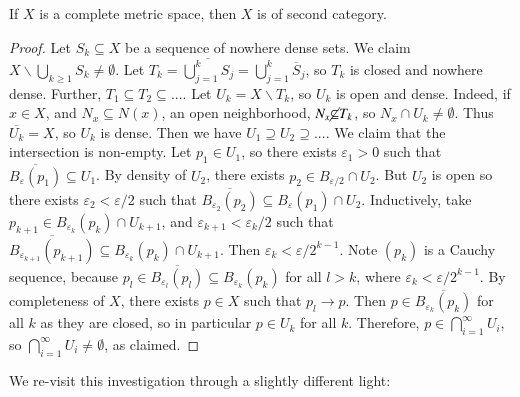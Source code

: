 \begin{theorem}
    If $X$ is a complete metric space, then $X$ is of second category.
\end{theorem}
\begin{proof}
    Let $S_k \subseteq X$ be a sequence of nowhere dense sets. We claim $X \backslash \bigcup_{k\geq 1}S_k \neq \emptyset$. Let $T_k = \overline{\bigcup_{j=1}^kS_j} = \bigcup_{j=1}^k\overline{S}_j$, so $T_k$ is closed and nowhere dense. Further, $T_1 \subseteq T_2 \subseteq ...$. Let $U_k = X\backslash T_k$, so $U_k$ is open and dense. Indeed, if $x \in X$, and $N_x \subseteq N(x)$, an open neighborhood, $N_x \cancel{\subseteq}T_k$, so $N_x\cap U_k \neq \emptyset$. Thus $\overline{U_k} = X$, so $U_k$ is dense. Then we have $U_1 \supseteq U_2 \supseteq ...$. We claim that the intersection is non-empty. Let $p_1 \in U_1$, so there exists $\varepsilon_1 > 0$ such that $\overline{B_{\varepsilon}(p_1)} \subseteq U_1$. By density of $U_2$, there exists $p_2 \in B_{\varepsilon/2}\cap U_2$. But $U_2$ is open so there exists $\varepsilon_2 < \varepsilon/2$ such that $\overline{B_{\varepsilon_2}(p_2)} \subseteq B_{\varepsilon}(p_1)\cap U_2$. Inductively, take $p_{k+1} \in B_{\varepsilon_k}(p_k) \cap U_{k+1}$, and $\varepsilon_{k+1} < \varepsilon_k/2$ such that $\overline{B_{\varepsilon_{k+1}}(p_{k+1})} \subseteq B_{\varepsilon_k}(p_k) \cap U_{k+1}$. Then $\varepsilon_k < \varepsilon/2^{k-1}$. Note $(p_k)$ is a Cauchy sequence, because $p_l \in \overline{B_{\varepsilon_l}(p_l)} \subseteq B_{\varepsilon_k}(p_k)$ for all $l > k$, where $\varepsilon_k < \varepsilon/2^{k-1}$. By completeness of $X$, there exists $p \in X$ such that $p_l \rightarrow p$. Then $p \in \overline{B_{\varepsilon_k}(p_k)}$ for all $k$ as they are closed, so in particular $p \in U_k$ for all $k$. Therefore, $p \in \bigcap_{i=1}^{\infty}U_i$, so $\bigcap_{i=1}^{\infty}U_i\neq \emptyset$, as claimed.
\end{proof}

We re-visit this investigation through a slightly different light:


